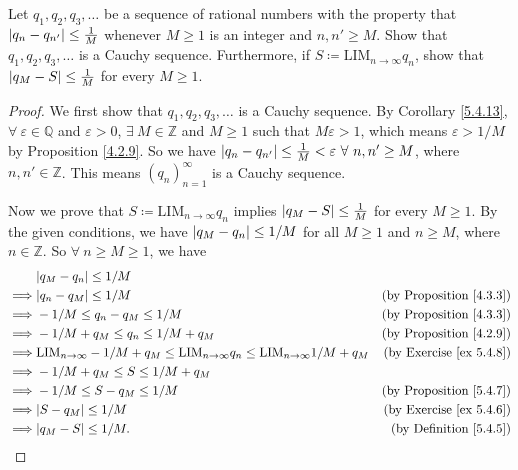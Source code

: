 \begin{exercise}\label{ex 5.5.4}
Let \(q_1, q_2, q_3, \dots\) be a sequence of rational numbers with the property that \(\abs*{q_n - q_{n'}} \leq \frac{1}{M}\) whenever \(M \geq 1\) is an integer and \(n, n' \geq M\).
Show that \(q_1, q_2, q_3, \dots\) is a Cauchy sequence.
Furthermore, if \(S \coloneqq \text{LIM}_{n \to \infty} q_n\), show that \(\abs*{q_M - S} \leq \frac{1}{M}\) for every \(M \geq 1\).
\end{exercise}

\begin{proof}
We first show that \(q_1, q_2, q_3, \dots\) is a Cauchy sequence.
By Corollary \ref{5.4.13}, \(\forall\ \varepsilon \in \mathds{Q}\) and \(\varepsilon > 0\), \(\exists\ M \in \mathds{Z}\) and \(M \geq 1\) such that \(M\varepsilon > 1\), which means \(\varepsilon > 1 / M\) by Proposition \ref{4.2.9}.
So we have \(\abs*{q_n - q_{n'}} \leq \frac{1}{M} < \varepsilon \ \forall\ n, n' \geq M\), where \(n, n' \in \mathds{Z}\).
This means \((q_n)_{n = 1}^{\infty}\) is a Cauchy sequence.

Now we prove that \(S \coloneqq \text{LIM}_{n \to \infty} q_n\) implies \(\abs*{q_M - S} \leq \frac{1}{M}\) for every \(M \geq 1\).
By the given conditions, we have \(\abs*{q_M - q_n} \leq 1 / M\) for all \(M \geq 1\) and \(n \geq M\), where \(n \in \mathds{Z}\).
So \(\forall\ n \geq M \geq 1\), we have
\begin{align*}
& \abs*{q_M - q_n} \leq 1 / M \\
\implies & \abs*{q_n - q_M} \leq 1 / M & \text{(by Proposition \ref{4.3.3})} \\
\implies & -1 / M \leq q_n - q_M \leq 1 / M & \text{(by Proposition \ref{4.3.3})} \\
\implies & -1 / M + q_M \leq q_n \leq 1 / M + q_M & \text{(by Proposition \ref{4.2.9})} \\
\implies & \text{LIM}_{n \to \infty} -1 / M + q_M \leq \text{LIM}_{n \to \infty} q_n \leq \text{LIM}_{n \to \infty} 1 / M + q_M & \text{(by Exercise \ref{ex 5.4.8})} \\
\implies & -1 / M + q_M \leq S \leq 1 / M + q_M \\
\implies & -1 / M \leq S - q_M \leq 1 / M & \text{(by Proposition \ref{5.4.7})} \\
\implies & \abs*{S - q_M} \leq 1 / M & \text{(by Exercise \ref{ex 5.4.6})} \\
\implies & \abs*{q_M - S} \leq 1 / M. & \text{(by Definition \ref{5.4.5})}
\end{align*}
\end{proof}
